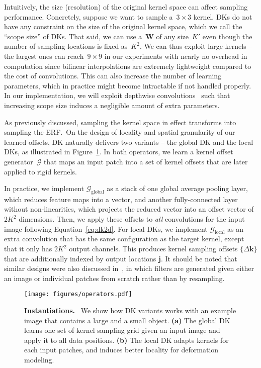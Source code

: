 \documentclass{article} \usepackage{iclr2020_conference, times}
\def\vj{{\bm{j}}}
\def\vk{{\bm{k}}}
\def\mW{{\bm{W}}}
\def\gG{{\mathcal{G}}}
\newcommand{\captiont}[2]{\caption{\textbf{#1} #2}}
\begin{document}
Intuitively, the size (resolution) of the original kernel space can
affect sampling performance.
Concretely, suppose we want to sample a~$3 \times 3$ kernel.
DKs do not have any constraint on the size of the original kernel space, which
we call the ``scope size'' of DKs.
That said, we can use a~$\mW$ of any size~$K'$ even though the number of
sampling locations is fixed as~$K^2$.
We can thus exploit large kernels -- the largest ones can reach~$9 \times 9$ in
our experiments with nearly no overhead in computation since bilinear
interpolations are extremely lightweight compared to the cost of
convolutions.
This can also increase the number of learning parameters, which in practice
might become intractable if not handled properly.
In our implementation, we will exploit depthwise
convolutions~\citep{howard2017mobilenets} such that increasing scope size
induces a negligible amount of extra parameters.

As previously discussed, sampling the kernel space in effect transforms into
sampling the ERF.\
On the design of locality and spatial granularity of our learned offsets,
DK naturally delivers two variants -- the global DK and the local DKs, as
illustrated in Figure~\ref{fig:operators}.
In both operators, we learn a kernel offset generator~$\gG$ that maps an input
patch into a set of kernel offsets that are later applied to rigid kernels.

In practice, we implement $\gG_{\text{global}}$ as a stack of one global
average pooling layer, which reduces feature maps into a vector, and another
fully-connected layer without non-linearities, which projects the reduced
vector into an offset vector of $2 K^2$ dimensions.
Then, we apply these offsets to \textit{all} convolutions for the input image
following Equation~\ref{eq:dk2d}.
For local DKs, we implement $\gG_{\text{local}}$ as an extra convolution that
has the same configuration as the target kernel, except that it only has $2 K^2$
output channels.
This produces kernel sampling offsets $\{\Delta \vk\}$ that are additionally
indexed by output locations $\vj$.
It should be noted that similar designs were also discussed
in~\citet{jia2016dynamic}, in which filters are generated given either an image
or individual patches from scratch rather than by resampling.

\begin{figure}[t]
    \centering
    \texttt{[image: figures/operators.pdf]}
    \captiont{Instantiations.}{\
        We show how DK variants works with an example image that contains a
        \textcolor{large}{large} and a \textcolor{small}{small} object.
        \textbf{(a)} The global DK learns one set of kernel sampling grid given
        an input image and apply it to all data positions.
        \textbf{(b)} The local DK adapts kernels for each input patches, and
        induces better locality for deformation modeling.
    }\vspace{-0.5em}
    \label{fig:operators}
\end{figure}
\end{document}
